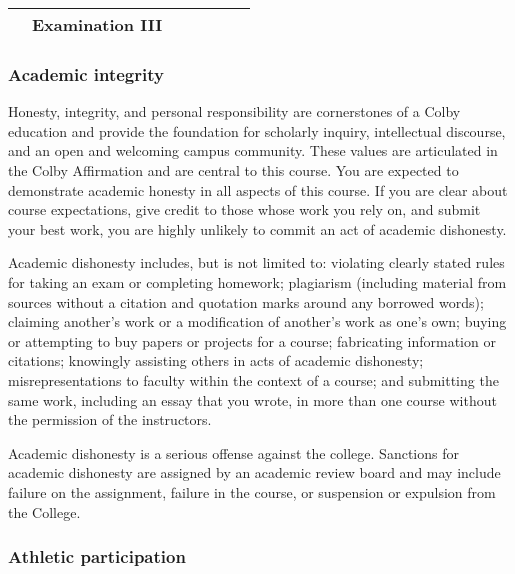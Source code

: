 \documentclass[]{article}
\begin{document}
\begin{longtable}[]{@{}cccllll@{}}
\begin{minipage}[t]{0.10\columnwidth}
\strut
\end{minipage} & \begin{minipage}[t]{0.11\columnwidth}\raggedright\strut
Examination III\strut
\end{minipage} & \begin{minipage}[t]{0.11\columnwidth}\raggedright\strut
\strut
\end{minipage} & \begin{minipage}[t]{0.16\columnwidth}\raggedright\strut
\strut
\end{minipage}\tabularnewline
\bottomrule
\end{longtable}

\subsubsection{Academic integrity }\label{academic-integrity}

Honesty, integrity, and personal responsibility are cornerstones of a
Colby education and provide the foundation for scholarly inquiry,
intellectual discourse, and an open and welcoming campus community.
These values are articulated in the Colby Affirmation and are central to
this course. You are expected to demonstrate academic honesty in all
aspects of this course. If you are clear about course expectations, give
credit to those whose work you rely on, and submit your best work, you
are highly unlikely to commit an act of academic dishonesty.

Academic dishonesty includes, but is not limited to: violating clearly
stated rules for taking an exam or completing homework; plagiarism
(including material from sources without a citation and quotation marks
around any borrowed words); claiming another's work or a modification of
another's work as one's own; buying or attempting to buy papers or
projects for a course; fabricating information or citations; knowingly
assisting others in acts of academic dishonesty; misrepresentations to
faculty within the context of a course; and submitting the same work,
including an essay that you wrote, in more than one course without the
permission of the instructors.

Academic dishonesty is a serious offense against the college. Sanctions
for academic dishonesty are assigned by an academic review board and may
include failure on the assignment, failure in the course, or suspension
or expulsion from the College.

\subsubsection{Athletic participation }\label{athletic-participation}
\end{document}

